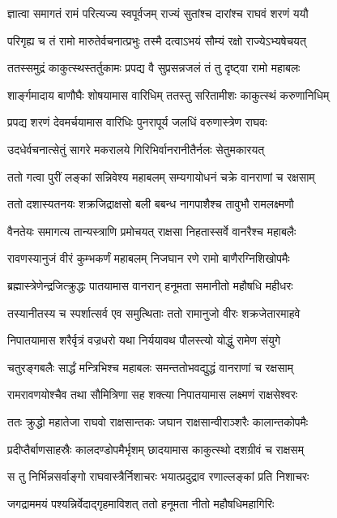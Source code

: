 \twolineshloka
{ज्ञात्वा समागतं रामं परित्यज्य स्वपूर्वजम्}
{राज्यं सुतांश्च दारांश्च राघवं शरणं ययौ}%

\twolineshloka
{परिगृह्य च तं रामो मारुतेर्वचनात्प्रभुः}
{तस्मै दत्वाऽभयं सौम्यं रक्षो राज्येऽभ्यषेचयत्}%

\twolineshloka
{ततस्समुद्रं काकुत्स्थस्तर्तुकामः प्रपद्य वै}
{सुप्रसन्नजलं तं तु दृष्ट्वा रामो महाबलः}%

\twolineshloka
{शार्ङ्गमादाय बाणौघैः शोषयामास वारिधिम्}
{ततस्तु सरितामीशः काकुत्स्थं करुणानिधिम्}%

\twolineshloka
{प्रपद्य शरणं देवमर्चयामास वारिधिः}
{पुनरापूर्य जलधिं वरुणास्त्रेण राघवः}%

\twolineshloka
{उदधेर्वचनात्सेतुं सागरे मकरालये}
{गिरिभिर्वानरानीतैर्नलः सेतुमकारयत्}%

\twolineshloka
{ततो गत्वा पुरीं लङ्कां सन्निवेश्य महाबलम्}
{सम्यगायोधनं चक्रे वानराणां च रक्षसाम्}%

\twolineshloka
{ततो दशास्यतनयः शक्रजिद्राक्षसो बली}
{बबन्ध नागपाशैश्च तावुभौ रामलक्ष्मणौ}%

\twolineshloka
{वैनतेयः समागत्य तान्यस्त्राणि प्रमोचयत्}
{राक्षसा निहतास्सर्वे वानरैश्च महाबलैः}%

\twolineshloka
{रावणस्यानुजं वीरं कुम्भकर्णं महाबलम्}
{निजघान रणे रामो बाणैरग्निशिखोपमैः}%

\twolineshloka
{ब्रह्मास्त्रेणेन्द्रजित्क्रुद्धः पातयामास वानरान्}
{हनूमता समानीतो महौषधि महीधरः}%

\twolineshloka
{तस्यानीतस्य च स्पर्शात्सर्व एव समुत्थिताः}
{ततो रामानुजो वीरः शक्रजेतारमाहवे}%

\twolineshloka
{निपातयामास शरैर्वृत्रं वज्रधरो यथा}
{निर्ययावथ पौलस्त्यो योद्धुं रामेण संयुगे}%

\twolineshloka
{चतुरङ्गबलैः सार्द्धं मन्त्रिभिश्च महाबलः}
{समन्ततोभवद्युद्धं वानराणां च रक्षसाम्}%

\twolineshloka
{रामरावणयोश्चैव तथा सौमित्रिणा सह}
{शक्त्या निपातयामास लक्ष्मणं राक्षसेश्वरः}%

\twolineshloka
{ततः क्रुद्धो महातेजा राघवो राक्षसान्तकः}
{जघान राक्षसान्वीराञ्शरैः कालान्तकोपमैः}%

\twolineshloka
{प्रदीप्तैर्बाणसाहस्रैः कालदण्डोपमैर्भृशम्}
{छादयामास काकुत्स्थो दशग्रीवं च राक्षसम्}%

\twolineshloka
{स तु निर्भिन्नसर्वाङ्गो राघवास्त्रैर्निशाचरः}
{भयात्प्रदुद्राव रणाल्लङ्कां प्रति निशाचरः}%

\twolineshloka
{जगद्राममयं पश्यन्निर्वेदाद्गृहमाविशत्}
{ततो हनूमता नीतो महौषधिमहागिरिः}%

